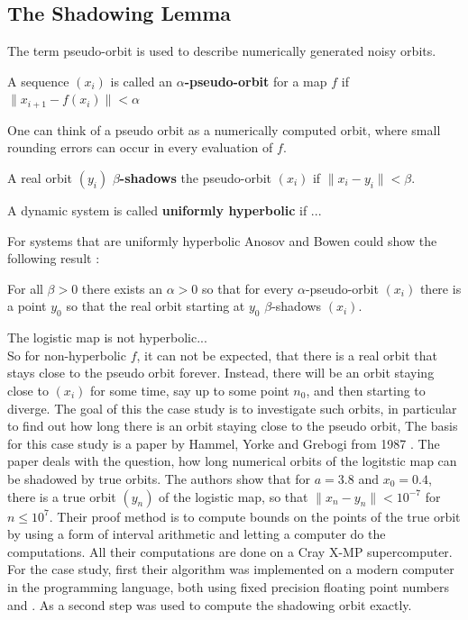   \subsection{The Shadowing Lemma}
    The term pseudo-orbit is used to describe numerically generated noisy orbits. 
    \begin{definition}\label{def:pseudoorbit}
      A sequence $(x_i)$ is called an \textbf{$\alpha$-pseudo-orbit} for a map $f$ if
      $ \| x_{i+1} - f(x_i) \| < \alpha $  
    \end{definition}
    One can think of a pseudo orbit as a numerically computed orbit, where small rounding errors can occur in every evaluation of $f$.
    \begin{definition}\label{def:shadowing}
      A real orbit $(y_i)$ \textbf{$\beta$-shadows} the pseudo-orbit $(x_i)$ if 
      $\| x_i - y_i \| < \beta$.  
    \end{definition}
    \begin{definition}
      A dynamic system is called \textbf{uniformly hyperbolic} if ...
    \end{definition}
    For systems that are uniformly hyperbolic Anosov and Bowen could show the following result \cite{anosov1967} \cite{Bowen1975} \cite{Hasselblatt:2008}:
    \begin{theorem}
     For all $\beta > 0$ there exists an $\alpha > 0$ so that for every $\alpha$-pseudo-orbit $(x_i)$ there is a point $y_0$ so that the real orbit starting at $y_0$ $\beta$-shadows $(x_i)$.
    \end{theorem} 
    The logistic map is not hyperbolic...\\
    So for non-hyperbolic $f$, it can not be expected, that there is a real orbit that stays close to the pseudo orbit forever.
    Instead, there will be an orbit staying close to $(x_i)$ for some time, say up to some point $n_0$, and then starting to diverge. 
    The goal of this the case study is to investigate such orbits, in particular to find out how long there is an orbit staying close to the pseudo orbit,
    The basis for this case study is a paper by Hammel, Yorke and Grebogi from 1987 \cite{Hammel1987}.
    The paper deals with the question, how long numerical orbits of the logitstic map can be shadowed by true orbits.
    The authors show that for $a = 3.8$ and $x_0 = 0.4$, there is a true orbit $(y_n)$ of the logistic map, so that $\| x_n - y_n \| < 10^{-7}$ for $n \leq 10^7$.
    Their proof method is to compute bounds on the points of the true orbit by using a form of interval arithmetic and letting a computer do the computations. 
    All their computations are done on a Cray X-MP supercomputer. 
    For the case study, first their algorithm was implemented on a modern computer in the \cc programming language, both using fixed precision floating point numbers and \irram. 
    As a second step \irram was used to compute the shadowing orbit exactly.
